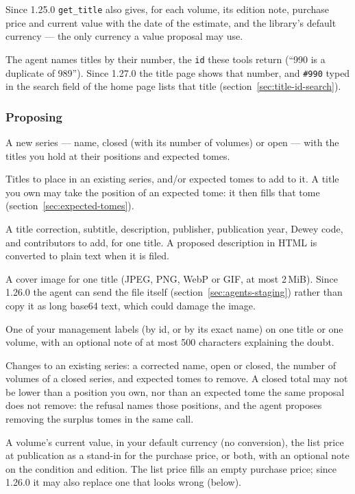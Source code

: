 Since 1.25.0 \texttt{get\_title} also gives, for each volume, its
edition note, purchase price and current value with the date of the
estimate, and the library's default currency --- the only currency a
value proposal may use.

The agent names titles by their number, the \texttt{id} these tools
return (``990 is a duplicate of 989''). Since 1.27.0 the title page
shows that number, and \texttt{\#990} typed in the search field of the
home page lists that title (section~\ref{sec:title-id-search}).

\subsubsection*{Proposing}

\begin{description}[style=nextline]
  \item[\texttt{propose\_series\_create}] A new series --- name,
        closed (with its number of volumes) or open --- with the
        titles you hold at their positions and expected tomes.
  \item[\texttt{propose\_series\_attach}] Titles to place in an
        existing series, and/or expected tomes to add to it. A title
        you own may take the position of an expected tome: it then
        fills that tome (section~\ref{sec:expected-tomes}).
  \item[\texttt{propose\_title\_metadata}] A title correction, subtitle, description,
        publisher, publication year, Dewey code, and contributors to
        add, for one title. A proposed description in HTML is
        converted to plain text when it is filed.
  \item[\texttt{propose\_cover}] A cover image for one title (JPEG,
        PNG, WebP or GIF, at most 2\,MiB). Since 1.26.0 the agent can send
        the file itself (section~\ref{sec:agents-staging}) rather than
        copy it as long base64 text, which could damage the image.
  \item[\texttt{propose\_label}] One of your management labels (by id,
        or by its exact name) on one title or one volume, with an
        optional note of at most 500 characters explaining the doubt.
  \item[\texttt{propose\_series\_update}] Changes to an existing
        series: a corrected name, open or closed, the number of
        volumes of a closed series, and expected tomes to remove. A
        closed total may not be lower than a position you own, nor
        than an expected tome the same proposal does not remove: the
        refusal names those positions, and the agent proposes removing
        the surplus tomes in the same call.
  \item[\texttt{propose\_volume\_value}] A volume's current value,
        in your default currency (no conversion), the list price at
        publication as a stand-in for the purchase price, or both, with
        an optional note on the condition and edition. The list price
        fills an empty purchase price; since 1.26.0 it may also replace
        one that looks wrong (below).
\end{description}

